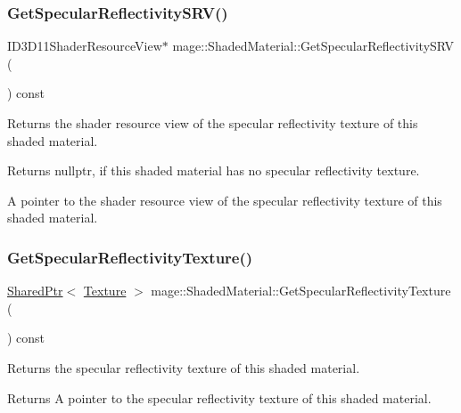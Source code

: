 \subsubsection{\texorpdfstring{Get\+Specular\+Reflectivity\+S\+R\+V()}{GetSpecularReflectivitySRV()}}
{\footnotesize\ttfamily I\+D3\+D11\+Shader\+Resource\+View$\ast$ mage\+::\+Shaded\+Material\+::\+Get\+Specular\+Reflectivity\+S\+RV (\begin{DoxyParamCaption}{ }\end{DoxyParamCaption}) const\hspace{0.3cm}{\ttfamily [noexcept]}}

Returns the shader resource view of the specular reflectivity texture of this shaded material.

\begin{DoxyReturn}{Returns}
{\ttfamily nullptr}, if this shaded material has no specular reflectivity texture. 

A pointer to the shader resource view of the specular reflectivity texture of this shaded material. 
\end{DoxyReturn}
\hypertarget{structmage_1_1_shaded_material_aabf7fea125dfdf4d97537f22e0003a9e}{}\label{structmage_1_1_shaded_material_aabf7fea125dfdf4d97537f22e0003a9e} 
\subsubsection{\texorpdfstring{Get\+Specular\+Reflectivity\+Texture()}{GetSpecularReflectivityTexture()}}
{\footnotesize\ttfamily \hyperlink{namespacemage_a1e01ae66713838a7a67d30e44c67703e}{Shared\+Ptr}$<$ \hyperlink{classmage_1_1_texture}{Texture} $>$ mage\+::\+Shaded\+Material\+::\+Get\+Specular\+Reflectivity\+Texture (\begin{DoxyParamCaption}{ }\end{DoxyParamCaption}) const\hspace{0.3cm}{\ttfamily [noexcept]}}

Returns the specular reflectivity texture of this shaded material.

\begin{DoxyReturn}{Returns}
A pointer to the specular reflectivity texture of this shaded material. 
\end{DoxyReturn}
\hypertarget{structmage_1_1_shaded_material_a6f7957db6f13954152ffb9b71644fe80}{}\label{structmage_1_1_shaded_material_a6f7957db6f13954152ffb9b71644fe80} 
